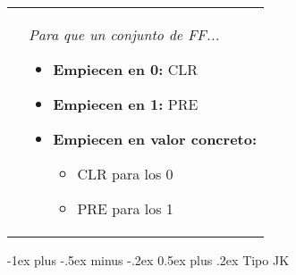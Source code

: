 \documentclass[11pt,english,landscape]{article}
\makeatletter
\renewcommand{\section}{\@startsection{section}{1}{0mm}%
  {-1ex plus -.5ex minus -.2ex}%
  {0.5ex plus .2ex}%
  {\normalfont\large\bfseries}}
\makeatother
\begin{document}
\begin{multicols}{3}
\begin{tabular}{p{} p{}}
		  &
		\textit{Para que un conjunto de FF...}
		\begin{itemize}

			\item[\textcolor{MaterialIndigo}{\textbullet}] \textbf{\textcolor{MaterialIndigo}{Empiecen en 0:}} CLR
			\item[\textcolor{MaterialPink}{\textbullet}]
			      \textbf{\textcolor{MaterialPink}{Empiecen en 1:}} PRE
			\item[\textcolor{MaterialPink}{\textbullet}]
			      \textbf{\textcolor{MaterialPink}{Empiecen en }\textcolor{MaterialIndigo}{valor concreto:}}

			      \begin{itemize}
				      \item[\textcolor{MaterialIndigo}{\textbullet}] \textcolor{MaterialIndigo}{CLR} para los \textcolor{MaterialIndigo}{0}
				      \item[\textcolor{MaterialPink}{\textbullet}] \textcolor{MaterialPink}{PRE} para los \textcolor{MaterialPink}{1}


			      \end{itemize}
		\end{itemize}
	\end{tabular}
	\newline
	\newline


	\columnbreak

	\centering\section{\textcolor{MaterialPurple}{Tipo JK}}

	\begin{tabular}{p{} c}


\end{tabular}
\end{multicols}
\end{document}
